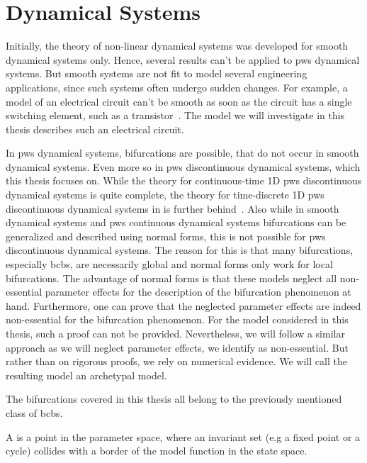 \section{ Dynamical Systems}
\label{sec:state.discont}

Initially, the theory of non-linear dynamical systems was developed for smooth dynamical systems only.
Hence, several results can't be applied to \gls{pws} dynamical systems.
But smooth systems are not fit to model several engineering applications, since such systems often undergo sudden changes.
For example, a model of an electrical circuit can't be smooth as soon as the circuit has a single switching element, such as a transistor~\cite{ZhuMos03}.
The model we will investigate in this thesis describes such an electrical circuit.

In \gls{pws} dynamical systems, bifurcations are possible, that do not occur in smooth dynamical systems.
Even more so in \gls{pws} discontinuous dynamical systems, which this thesis focuses on.
While the theory for continuous-time 1D \gls{pws} discontinuous dynamical systems is quite complete, the theory for time-discrete 1D \gls{pws} discontinuous dynamical systems in is further behind~\cite{Simpson16}.
Also while in smooth dynamical systems and \gls{pws} continuous dynamical systems bifurcations can be generalized and described using normal forms, this is not possible for \gls{pws} discontinuous dynamical systems.
The reason for this is that many bifurcations, especially \glspl{bcb}, are necessarily global and normal forms only work for local bifurcations.
The advantage of normal forms is that these models neglect all non-essential parameter effects for the description of the bifurcation phenomenon at hand.
Furthermore, one can prove that the neglected parameter effects are indeed non-essential for the bifurcation phenomenon.
For the model considered in this thesis, such a proof can not be provided.
Nevertheless, we will follow a similar approach as we will neglect parameter effects, we identify as non-essential.
But rather than on rigorous proofs, we rely on numerical evidence.
We will call the resulting model an archetypal model.

The bifurcations covered in this thesis all belong to the previously mentioned class of \glspl{bcb}.

\begin{definition}
	A  is a point in the parameter space, where an invariant set (e.g a fixed point or a cycle) collides with a border of the model function in the state space.
\end{definition}

